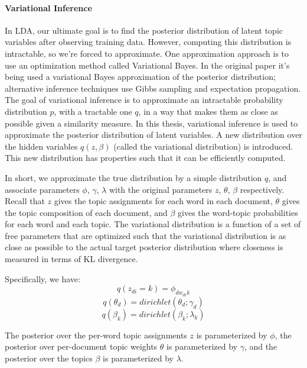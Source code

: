 \documentclass[12pt]{report}
\begin{document}
\paragraph{Variational Inference}

In LDA, our ultimate goal is to find the posterior distribution of latent topic 
variables after observing training data. However, computing this distribution 
is intractable, so we’re forced to approximate. One approximation approach is to 
use an optimization method called Variational Bayes. In the original paper it's 
being used a variational Bayes approximation of the posterior distribution;
\cite{blei2003latent} alternative inference techniques use Gibbs sampling and
expectation propagation. The goal of variational inference is to approximate an
intractable probability distribution $p$, with a tractable one $q$, in a way
that makes them as close as possible given a similarity measure. In this thesis,
variational inference is used to approximate the posterior distribution of
latent variables. A new distribution over the hidden variables $q(z, \beta)$
(called the variational distribution) is  introduced. This new distribution has
properties such that it can be efficiently computed.\cite{Fox2011ATO}

In short, we approximate the true distribution by a simple distribution $q$, and 
associate parameters $\phi$, $\gamma$, $\lambda$ with the original parameters 
$z$, $\theta$, $\beta$ respectively. Recall that $z$ gives the topic assignments 
for each word in each document, $\theta$ gives the topic composition of each 
document, and $\beta$ gives the word-topic probabilities for each word and each 
topic. The variational distribution is a function of a set of free parameters that 
are optimized such that the variational distribution is as close as possible to 
the actual target posterior distribution where closeness is measured in terms of 
KL divergence.

Specifically, we have:
\begin{equation}
q(z_{di}=k) = \phi_{dw_{di}k}
\end{equation}
\begin{equation}
q(\theta_{d}) = dirichlet(\theta_{d}; \gamma_{d})
\end{equation}
\begin{equation}
q(\beta_{k}) = dirichlet(\beta_{k}; \lambda_{k})
\end{equation}

The posterior over the per-word topic assignments $z$ is parameterized by
$\phi$, the posterior over per-document topic weights $\theta$ is parameterized
by $\gamma$, and the posterior over the topics $\beta$ is parameterized by
$\lambda$. 
\end{document}
